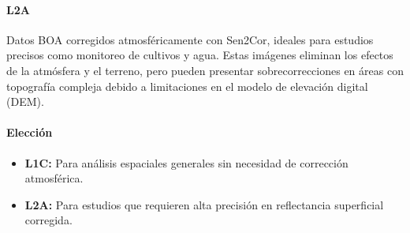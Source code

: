             \paragraph{L2A}
            Datos BOA corregidos atmosféricamente con Sen2Cor, ideales para estudios precisos como monitoreo de cultivos y agua. Estas imágenes eliminan los efectos de la atmósfera y el terreno, pero pueden presentar sobrecorrecciones en áreas con topografía compleja debido a limitaciones en el modelo de elevación digital (DEM).
            
            \paragraph{Elección}
            \begin{itemize}
                \item \textbf{L1C:} Para análisis espaciales generales sin necesidad de corrección atmosférica.
                \item \textbf{L2A:} Para estudios que requieren alta precisión en reflectancia superficial corregida.
            \end{itemize}
            
            
            
